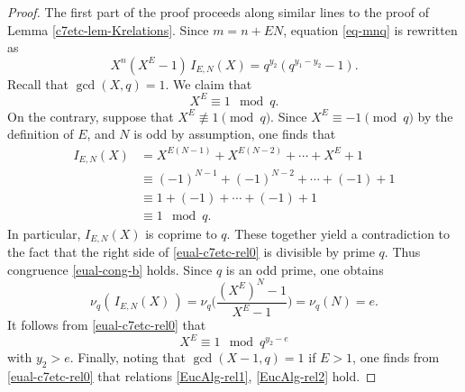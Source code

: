 \documentclass[11pt]{amsart}
\numberwithin{equation}{section}
\begin{document}
\begin{proof}
The first part of the proof proceeds along similar lines to the proof of Lemma \ref{c7etc-lem-Krelations}.
Since $m=n+E N$, equation \eqref{eq-mnq} is rewritten as
\begin{equation}\label{eual-c7etc-rel0}
X^n (X^E-1)\,I_{E,N}( X )=q^{y_2}(q^{y_1-y_2}-1).
\end{equation}
Recall that $\gcd(X,q)=1$.
We claim that
\begin{equation}\label{eual-cong-b}
X^E \equiv 1 \mod{q}.
\end{equation}
On the contrary, suppose that $X^E \not\equiv 1 \pmod{q}$.
Since $X^E \equiv -1 \pmod{q}$ by the definition of $E$, and $N$ is odd by assumption, one finds that
\begin{align*}
I_{E,N}( X )&=X^{E(N-1)}+X^{E(N-2)}+ \cdots +X^E+1 \\
&\equiv (-1)^{N-1}+(-1)^{N-2}+ \cdots +(-1)+1\\
& \equiv 1+(-1)+\cdots +(-1)+1 \\
&\equiv 1 \mod{q}.
\end{align*}
In particular, $I_{E,N}( X )$ is coprime to $q$.
These together yield a contradiction to the fact that the right side of \eqref{eual-c7etc-rel0} is divisible by prime $q$.
Thus congruence \eqref{eual-cong-b} holds.
Since $q$ is an odd prime, one obtains
\[
\nu_q(\,I_{E,N}( X )\,)=\nu_q\bigg(\frac{(X^E)^N-1}{X^E-1}\bigg)=\nu_{q}(N)=e.
\]
It follows from \eqref{eual-c7etc-rel0} that 
\[
X^E \equiv 1 \mod{q^{y_2-e}}
\]
with $y_2>e$.
Finally, noting that $\gcd(X-1,q)=1$ if $E>1$, one finds from \eqref{eual-c7etc-rel0} that relations \eqref{EucAlg-rel1}, \eqref{EucAlg-rel2} hold.


\end{proof}
\end{document}
